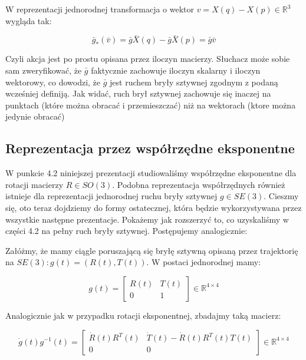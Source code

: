 \documentclass[a4paper,12pt]{article}
\newcommand{\RR}{\mathbb{R}^3}
\newcommand{\RRRq}{\mathbb{R}^{4 \times 4}}
\begin{document}
W reprezentacji jednorodnej transformacja o wektor $v = X(q) - X(p) \in \RR$ wygląda tak:

\begin{equation}
\bar{g}_*(\bar{v}) = \bar{g}\bar{X}(q) - \bar{g}\bar{X}(p) = \bar{g}\bar{v}
\end{equation}

Czyli akcja jest po prostu opisana przez iloczyn macierzy. Słuchacz może sobie sam zweryfikować, że $\bar{g}$ faktycznie zachowuje iloczyn skalarny i iloczyn wektorowy, co dowodzi, że $\bar{g}$ jest ruchem bryły sztywnej zgodnym z podaną wcześniej definiją. Jak widać, ruch brył sztywnej zachowuje się inaczej na punktach (które można obracać i przemieszczać) niż na wektorach (ktore można jedynie obracać)


\subsection{Reprezentacja przez współrzędne eksponentne}

W punkcie 4.2 niniejszej prezentacji studiowaliśmy współrzędne eksponentne dla rotacji macierzy $R \in SO(3)$. Podobna reprezentacja współrzędnych również istnieje dla reprezentacji jednorodnej ruchu bryły sztywnej $g \in SE(3)$. Cieszmy się, oto teraz dojdziemy do formy ostatecznej, która będzie wykorzystywana przez wszystkie następne prezentacje. Pokażemy jak rozszerzyć to, co uzyskaliśmy w części 4.2 na pełny ruch bryły sztywnej. Postępujemy analogicznie:

Załóżmy, że mamy ciągle poruszającą się bryłę sztywną opisaną przez trajektorię na $SE(3): g(t)=(R(t),T(t))$. W postaci jednorodnej mamy:

\begin{equation}
g(t)=\begin{bmatrix} R(t) & T(t) \\ 0 & 1 \end{bmatrix} \in \RRRq
\end{equation}

Analogicznie jak w przypadku rotacji eksponentnej, zbadajmy taką macierz:

\begin{equation}
\dot{g}(t)g^{-1}(t) = \begin{bmatrix} \dot{R}(t)R^T(t) & \dot{T}(t) - \dot{R}(t)R^T(t)T(t) \\ 0 & 0 \end{bmatrix} \in \RRRq
\end{equation}
\end{document}
